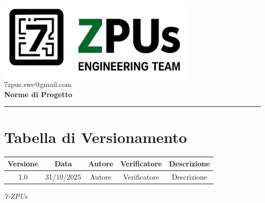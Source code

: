 \documentclass[a4paper,12pt]{article}
\begin{document}
\begin{center}
    \includegraphics[width=9.5cm]{../assets/logo7ZPUs.jpg}\\
    \small\hspace{10cm} 7zpus.swe@gmail.com\\
    \vspace{0.5cm}
    \Large \textbf{Norme di Progetto}\\
\end{center}

\vspace{0.3cm}
\hrule
\vspace{0.5cm}

\tableofcontents

\newpage

\section*{Tabella di Versionamento}
\begin{tabular}{|c|c|c|c|c|}
    \hline
    \textbf{Versione} & \textbf{Data} & \textbf{Autore}  & \textbf{Verificatore} & \textbf{Descrizione} \\
    \hline
    1.0 & 31/10/2025 & Autore & Verificatore & Descrizione \\
    \hline

\end{tabular}


\vfill
\begin{flushright}
    \textit{7-ZPUs}
\end{flushright}
\end{document}
